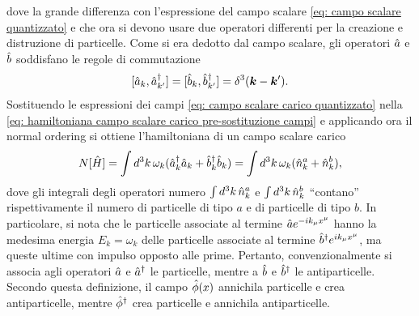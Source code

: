 dove la grande differenza con l'espressione del campo scalare \eqref{eq: campo scalare quantizzato} e che ora si devono usare due operatori differenti per la creazione e distruzione di particelle. Come si era dedotto dal campo scalare, gli operatori $\hat{a}$ e $\hat{b}$ soddisfano le regole di commutazione
\begin{equation}
    [\hat{a}_k,\hat{a}^\dagger_{k'}] = [\hat{b}_k,\hat{b}^\dagger_{k'}] = \delta^3(\bm{k} - \bm{k}').
\end{equation}
Sostituendo le espressioni dei campi \eqref{eq: campo scalare carico quantizzato} nella \eqref{eq: hamiltoniana campo scalare carico pre-sostituzione campi} e applicando ora il normal ordering si ottiene l'hamiltoniana di un campo scalare carico
\begin{equation}
\label{eq: hamiltoniana campo scalare carico}
    N[\hat{H}] = \int d^3k\,\omega_k(\hat{a}^\dagger_k\hat{a}_k + \hat{b}^\dagger_k\hat{b}_k) = \int d^3k\,\omega_k(\hat{n}^a_k + \hat{n}_k^b),
\end{equation}
dove gli integrali degli operatori numero $\int d^3k\,\hat{n}^a_k$ e $\int d^3k\,\hat{n}_k^b$ ``contano'' rispettivamente il numero di particelle di tipo $a$ e di particelle di tipo $b$. In particolare, si nota che le particelle associate al termine $\hat{a} e^{-ik_\mu x^\mu}$ hanno la medesima energia $E_k = \omega_k$ delle particelle associate al termine $\hat{b}^\dagger e^{ik_\mu x^\mu}$, ma queste ultime con impulso opposto alle prime. Pertanto, convenzionalmente si associa agli operatori $\hat{a}$ e $\hat{a}^\dagger$ le particelle, mentre a $\hat{b}$ e $\hat{b}^\dagger$ le antiparticelle. Secondo questa definizione, il campo $\hat{\phi}(x)$ annichila particelle e crea antiparticelle, mentre $\hat{\phi}^\dagger$ crea particelle e annichila antiparticelle.

